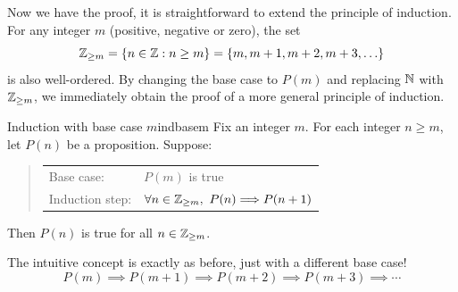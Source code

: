 Now we have the proof, it is straightforward to extend the principle of induction. For any integer $m$ (positive, negative or zero), the set
\[
	\mathbb{Z}_{\ge m}=\{n\in\mathbb{Z}:n\ge m\}=\{m,m+1,m+2,m+3,\ldots\}
\]
is also well-ordered. By changing the base case to $P(m)$ and replacing $\mathbb{N}$ with $\mathbb{Z}_{\ge m}$, we immediately obtain the proof of a more general principle of induction.

\begin{cor}{Induction with base case $m$}{indbasem}
	Fix an integer $m$. For each integer $n\ge m$, let $P(n)$ be a proposition. Suppose:
	\begin{quote}
		\begin{tabular}{@{}ll}
			Base case: &$P(m)$ is true\\[5pt]
			Induction step: &$\forall n\in\mathbb{Z}_{\ge m},\ P(n)\Longrightarrow P(n+1)$
		\end{tabular}
	\end{quote}
	Then $P(n)$ is true for all $n\in\mathbb{Z}_{\ge m}$.
\end{cor}

The intuitive concept is exactly as before, just with a different base case!
\[
	P(m)\implies P(m+1)\implies P(m+2)\implies P(m+3)\implies\cdots
\]
\goodbreak



